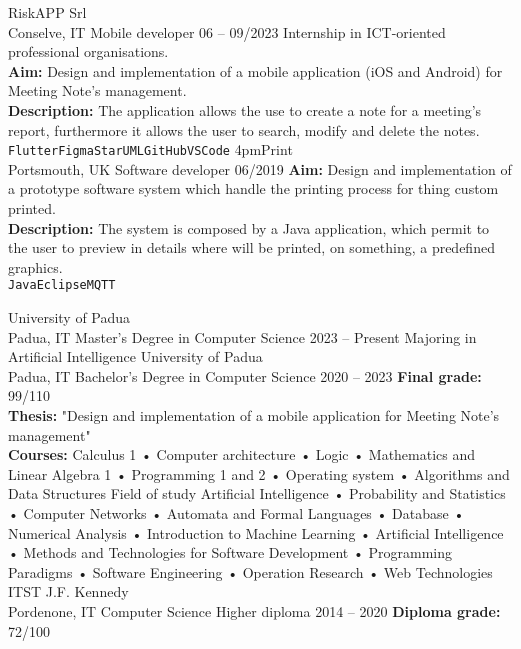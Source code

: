 \documentclass[9pt]{developercv} %
\begin{document}
\begin{entrylist}
	\entry
		{RiskAPP Srl\\\footnotesize{Conselve, IT}}
		{Mobile developer}
		{06 -- 09/2023}
		{Internship in ICT-oriented professional organisations. \\
		\textbf{Aim:} Design and implementation of a mobile application (iOS and Android) for Meeting Note's management. \\
		\textbf{Description:} The application allows the use to create a note for a meeting's report, furthermore it allows the user to search, modify and delete the notes. \\
		\texttt{Flutter}\slashsep\texttt{Figma}\slashsep\texttt{StarUML}\slashsep\texttt{GitHub}\slashsep\texttt{VSCode}}
	\entry
		{4pmPrint\\\footnotesize{Portsmouth, UK}}
		{Software developer}
		{06/2019}
		{\textbf{Aim:} Design and implementation of a prototype software system which handle the printing process for thing custom printed. \\
		\textbf{Description:} The system is composed by a Java application, which permit to the user to preview in details where will be printed, on something, a predefined graphics. \\
		\texttt{Java}\slashsep\texttt{Eclipse}\slashsep\texttt{MQTT}}
\end{entrylist}



\begin{entrylist}
	\entry
		{University of Padua\\\footnotesize{Padua, IT}}
		{Master's Degree in Computer Science}
		{2023 -- Present}
		{Majoring in Artificial Intelligence}
	\entry
		{University of Padua\\\footnotesize{Padua, IT}}
		{Bachelor's Degree in Computer Science}
		{2020 -- 2023}
		{\textbf{Final grade:} 99/110 \\
		\textbf{Thesis:} "Design and implementation of a mobile application for Meeting Note's management" \\
		\textbf{Courses:} Calculus 1 • Computer architecture • Logic
		• Mathematics and Linear Algebra 1 • Programming 1 and 2
		• Operating system
		• Algorithms and Data Structures
		Field of study Artificial Intelligence
		• Probability and Statistics
		• Computer Networks
		• Automata and Formal Languages
		• Database
		• Numerical Analysis
		• Introduction to Machine Learning
		• Artificial Intelligence
		• Methods and Technologies for Software Development • Programming Paradigms
		• Software Engineering
		• Operation Research
		• Web Technologies}
	\entry
		{ITST J.F. Kennedy\\\footnotesize{Pordenone, IT}}
		{Computer Science Higher diploma}
		{2014 -- 2020}
		{\textbf{Diploma grade:} 72/100}
\end{entrylist}
\end{document}
